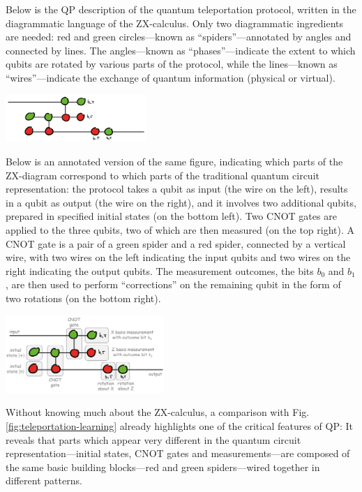 Below is the QP description of the quantum teleportation protocol, written in the diagrammatic language of the ZX-calculus.
Only two diagrammatic ingredients are needed: red and green circles---known as ``spiders''---annotated by angles and connected by lines.
The angles---known as ``phases''---indicate the extent to which qubits are rotated by various parts of the protocol, while the lines---known as ``wires''---indicate the exchange of quantum information (physical or virtual).
\begin{center}
    \includegraphics[width=0.4\textwidth]{Sections/pictures/teleportation-zx-raw.png}
\end{center}
Below is an annotated version of the same figure, indicating which parts of the ZX-diagram correspond to which parts of the traditional quantum circuit representation: the protocol takes a qubit as input (the wire on the left), results in a qubit as output (the wire on the right), and it involves two additional qubits, prepared in specified initial states (on the bottom left).
Two CNOT gates are applied to the three qubits, two of which are then measured (on the top right). A CNOT gate is a pair of a green spider and a red spider, connected by a vertical wire, with two wires on the left indicating the input qubits and two wires on the right indicating the output qubits.
The measurement outcomes, the bits $b_0$ and $b_1$, are then used to perform ``corrections'' on the remaining qubit in the form of two rotations (on the bottom right).
\begin{center}
    \includegraphics[width=0.45\textwidth]{Sections/pictures/teleportation-zx-annotated.png}
\end{center}
Without knowing much about the ZX-calculus, a comparison with Fig. \ref{fig:teleportation-learning} already highlights one of the critical features of QP: It reveals that parts which appear very different in the quantum circuit representation---initial states, CNOT gates and measurements---are composed of the same basic building blocks---red and green spiders---wired together in different patterns.

